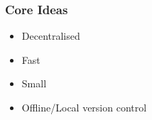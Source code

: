 \begin{frame}
\frametitle{Core Ideas}
	\begin{block}{}
	\begin{itemize}
		\item Decentralised
		\item Fast
		\item Small
		\item Offline/Local version control
	\end{itemize}
	\end{block}
\end{frame}
